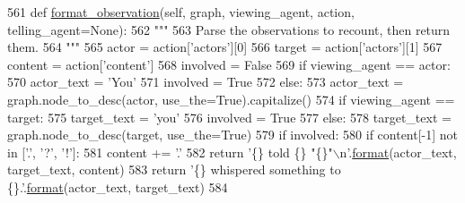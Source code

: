 \begin{DoxyCode}
561     \textcolor{keyword}{def }\hyperlink{namespacelight__chats_1_1graph_a6d359942394976812f0055affc289f56}{format\_observation}(self, graph, viewing\_agent, action, telling\_agent=None):
562         \textcolor{stringliteral}{"""}
563 \textcolor{stringliteral}{        Parse the observations to recount, then return them.}
564 \textcolor{stringliteral}{        """}
565         actor = action[\textcolor{stringliteral}{'actors'}][0]
566         target = action[\textcolor{stringliteral}{'actors'}][1]
567         content = action[\textcolor{stringliteral}{'content'}]
568         involved = \textcolor{keyword}{False}
569         \textcolor{keywordflow}{if} viewing\_agent == actor:
570             actor\_text = \textcolor{stringliteral}{'You'}
571             involved = \textcolor{keyword}{True}
572         \textcolor{keywordflow}{else}:
573             actor\_text = graph.node\_to\_desc(actor, use\_the=\textcolor{keyword}{True}).capitalize()
574         \textcolor{keywordflow}{if} viewing\_agent == target:
575             target\_text = \textcolor{stringliteral}{'you'}
576             involved = \textcolor{keyword}{True}
577         \textcolor{keywordflow}{else}:
578             target\_text = graph.node\_to\_desc(target, use\_the=\textcolor{keyword}{True})
579         \textcolor{keywordflow}{if} involved:
580             \textcolor{keywordflow}{if} content[-1] \textcolor{keywordflow}{not} \textcolor{keywordflow}{in} [\textcolor{stringliteral}{'.'}, \textcolor{stringliteral}{'?'}, \textcolor{stringliteral}{'!'}]:
581                 content += \textcolor{stringliteral}{'.'}
582             \textcolor{keywordflow}{return} \textcolor{stringliteral}{'\{\} told \{\} "\{\}"\(\backslash\)n'}.\hyperlink{namespaceparlai_1_1chat__service_1_1services_1_1messenger_1_1shared__utils_a32e2e2022b824fbaf80c747160b52a76}{format}(actor\_text, target\_text, content)
583         \textcolor{keywordflow}{return} \textcolor{stringliteral}{'\{\} whispered something to \{\}.'}.\hyperlink{namespaceparlai_1_1chat__service_1_1services_1_1messenger_1_1shared__utils_a32e2e2022b824fbaf80c747160b52a76}{format}(actor\_text, target\_text)
584 
\end{DoxyCode}
\mbox{\label{classlight__chats_1_1graph_1_1TellFunction_a91e865e9bbba1f3ed3f01445896be21d}} 
